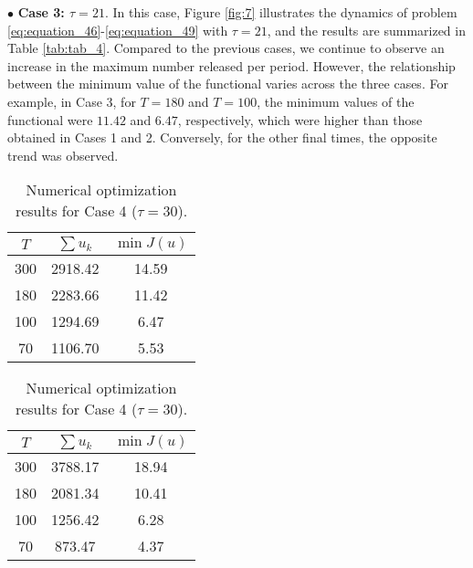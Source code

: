 \documentclass[10pt,letterpaper]{article}
\begin{document}
$\bullet$ \textbf{Case 3: $\tau = 21$}. In this case, Figure \eqref{fig:7} illustrates the dynamics of problem \eqref{eq:equation_46}-\eqref{eq:equation_49} with $\tau = 21$, and the results are summarized in Table \eqref{tab:tab_4}. Compared to the previous cases, we continue to observe an increase in the maximum number released per period. However, the relationship between the minimum value of the functional varies across the three cases. For example, in Case 3, for $T = 180$ and $T = 100$, the minimum values of the functional were $11.42$ and $6.47$, respectively, which were higher than those obtained in Cases 1 and 2. Conversely, for the other final times, the opposite trend was observed.

\begin{table}[h!]
\centering
\begin{minipage}{0.48\textwidth}
\centering
\caption{Numerical optimization results for Case 3 ($\tau = 21$).}
\begin{tabular}{ccc}
\hline
\textbf{$T$} & \textbf{$\sum u_k$} & \textbf{$\min J(u)$} \\ \hline
300                       & 2918.42                                     & 14.59                                           \\ 
180                       & 2283.66                                     & 11.42                                           \\ 
100                       & 1294.69                                     & 6.47                                            \\ 
70                        & 1106.70                                     & 5.53                                            \\ \hline
\end{tabular}
\label{tab:tab_4}
\end{minipage}%
\hfill
\begin{minipage}{0.48\textwidth}
\centering
\caption{Numerical optimization results for Case 4 ($\tau = 30$).}
\begin{tabular}{ccc}
\hline
\textbf{$T$} & \textbf{$\sum u_k$} & \textbf{$\min J(u)$} \\ \hline
300                       & 3788.17                                     & 18.94                                           \\ 
180                       & 2081.34                                     & 10.41                                           \\ 
100                       & 1256.42                                     & 6.28                                            \\ 
70                        & 873.47                                      & 4.37                                            \\ \hline
\end{tabular}
\label{tab:tab_5}
\end{minipage}
\end{table}
\end{document}
